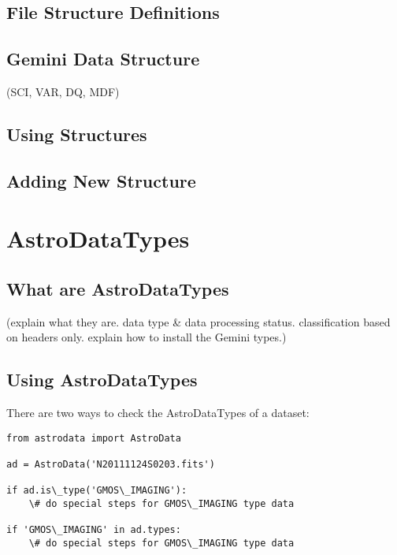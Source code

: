 \documentclass[letterpaper,10pt,english]{sphinxmanual}
\begin{document}
\section{File Structure Definitions}
\label{structure:file-structure-definitions}

\section{Gemini Data Structure}
\label{structure:gemini-data-structure}
(SCI, VAR, DQ, MDF)


\section{Using Structures}
\label{structure:using-structures}

\section{Adding New Structure}
\label{structure:adding-new-structure}

\chapter{AstroDataTypes}
\label{types:astrodatatypes}\label{types::doc}

\section{What are AstroDataTypes}
\label{types:what-are-astrodatatypes}
(explain what they are. data type \& data processing status. classification based on headers only.
explain how to install the Gemini types.)


\section{Using AstroDataTypes}
\label{types:using-astrodatatypes}
There are two ways to check the AstroDataTypes of a dataset:

\begin{Verbatim}[commandchars=\\\{\}]
from astrodata import AstroData

ad = AstroData('N20111124S0203.fits')

if ad.is\_type('GMOS\_IMAGING'):
    \# do special steps for GMOS\_IMAGING type data

if 'GMOS\_IMAGING' in ad.types:
    \# do special steps for GMOS\_IMAGING type data
\end{Verbatim}
\end{document}
